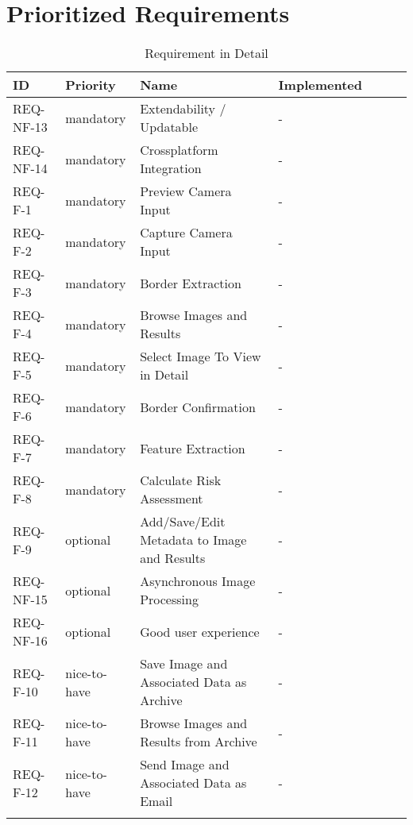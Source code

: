 \section{Prioritized Requirements}

\begin{longtable}{ | l | l | l | l | l | l | l |}
\hline
ID & Priority & Name & Implemented  \\ \hline

REQ-NF-13 & mandatory & Extendability / Updatable & -  \\ \hline
REQ-NF-14 & mandatory & Crossplatform Integration & -  \\ \hline
REQ-F-1 & mandatory & Preview Camera Input & -  \\ \hline
REQ-F-2 & mandatory & Capture Camera Input & -  \\ \hline
REQ-F-3 & mandatory & Border Extraction & -  \\ \hline
REQ-F-4 & mandatory & Browse Images and Results & -  \\ \hline
REQ-F-5 & mandatory & Select Image To View in Detail & -  \\ \hline
REQ-F-6 & mandatory & Border Confirmation & -  \\ \hline
REQ-F-7 & mandatory & Feature Extraction & -  \\ \hline
REQ-F-8 & mandatory & Calculate Risk Assessment & -  \\ \hline
REQ-F-9 & optional & Add/Save/Edit Metadata to Image and Results & -  \\ \hline
REQ-NF-15 & optional & Asynchronous Image Processing & -  \\ \hline
REQ-NF-16 & optional & Good user experience & -  \\ \hline
REQ-F-10 & nice-to-have & Save Image and Associated Data as Archive & -  \\ \hline
REQ-F-11 & nice-to-have & Browse Images and Results from Archive & -  \\ \hline
REQ-F-12 & nice-to-have & Send Image and Associated Data as Email & -  \\ \hline

\caption{Requirement in Detail}
\label{fig:prio_req}
\end{longtable}
